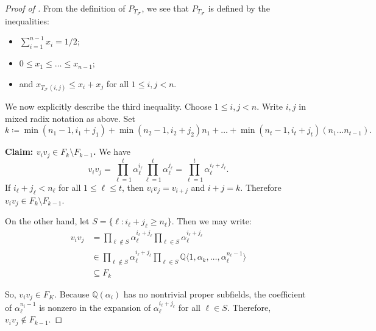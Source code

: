 \documentclass[letterpaper,10pt]{amsart}
\newcommand{\QQ}{\mathbb{Q}}      %
\newcommand{\la}{\langle}
\newcommand{\ra}{\rangle}
\newcommand{\cF}{\mathcal{F}}
\theoremstyle{definition}
\theoremstyle{remark}
\begin{document}
\begin{proof}[Proof of ]
From the definition of $P_{T_{\cF}}$, we see that $P_{T_{\cF}}$ is defined by the inequalities:
\begin{itemize}
    \item $\sum_{i = 1}^{n-1}x_i = 1/2$;
    \item $0 \leq x_1 \leq \dots \leq x_{n-1}$;
    \item and $x_{T_{\cF}(i,j)} \leq x_i + x_j$ for all $1 \leq i,j < n$. 
\end{itemize}
We now explicitly describe the third inequality. Choose $1 \leq i,j < n$. Write $i,j$ in mixed radix notation as above. Set 
\[
     k \coloneqq \min(n_1 - 1, i_1 + j_1) + \min(n_2 - 1, i_2 + j_2) n_1 +  \dots + \min(n_t - 1, i_t + j_t)(n_1\dots n_{t-1}).
\]

\noindent \textbf{Claim: $v_iv_j \in F_{k} \setminus F_{k-1}$.}
We have 
\[
    v_i v_j = \prod_{\ell = 1}^t \alpha_\ell^{i_\ell} \prod_{\ell = 1}^t \alpha_\ell^{j_\ell} = \prod_{\ell = 1}^t \alpha_\ell^{i_\ell + j_\ell}. 
\]
If $i_\ell + j_\ell < n_\ell$ for all $1 \leq \ell \leq t$, then $v_iv_j = v_{i+j}$ and $i + j = k$. Therefore $v_i v_j \in F_{k} \setminus F_{k - 1}$.


On the other hand, let $S = \{\ell : i_\ell + j_\ell \geq n_\ell\}$. Then we may write:
\begin{align*}
 v_i v_j &= \prod_{\ell \notin S} \alpha_\ell^{i_\ell + j_\ell} \prod_{\ell \in S} \alpha_\ell^{i_\ell + j_\ell} \\
 &\in \prod_{\ell \notin S} \alpha_\ell^{i_\ell + j_\ell} \prod_{\ell \in S} \QQ \la 1,
\alpha_k,\dots,\alpha_{\ell}^{n_\ell - 1}\ra \\
&\subseteq F_{k}
\end{align*}

So, $v_iv_j \in F_{K}$. Because $\QQ(\alpha_i)$ has no nontrivial proper subfields, the coefficient of $\alpha_\ell^{n_i - 1}$ is nonzero in the expansion of $\alpha_\ell^{i_\ell + j_\ell}$ for all $\ell \in S$. Therefore, $v_i v_j \notin F_{k - 1}$.


\end{proof}
\end{document}
